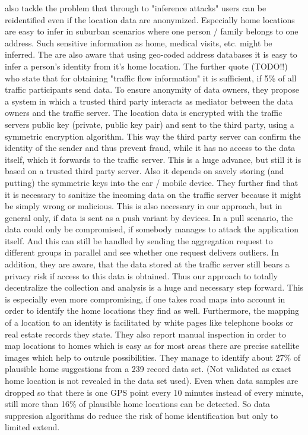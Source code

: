 \parencite{hoh2006enhancing} also tackle the problem that through to "inference attacks" users can be reidentified even if the location data are anonymized. Especially home locations are easy to infer in suburban scenarios where one person / family belongs to one address. Such sensitive information as home, medical visits, etc. might be inferred. The are also aware that using geo-coded address databases it is easy to infer a person's identity from it's home location. The further quote \parencite{dai2003simulation} (TODO!!) who state that for obtaining "traffic flow information" it is sufficient, if 5\% of all traffic participants send data. To ensure anonymity of data owners, they propose a system in which a trusted third party interacts as mediator between the data owners and the traffic server. The location data is encrypted with the traffic servers public key (private, public key pair) and sent to the third party, using a symmetric encryption algorithm. This way the third party server can confirm the identity of the sender and thus prevent fraud, while it has no access to the data itself, which it forwards to the traffic server. This is a huge advance, but still it is based on a trusted third party server. Also it depends on savely storing (and putting) the symmetric keys into the car / mobile device. They further find that it is necessary to sanitize the incoming data on the traffic server because it might be simply wrong or malicious. This is also necessary in our approach, but in general only, if data is sent as a push variant by devices. In a pull scenario, the data could only be compromised, if somebody manages to attack the application itself. And this can still be handled by sending the aggregation request to different groups in parallel and see whether one request delivers outliers. In addition, they are aware, that the data stored at the traffic server still bears a privacy risk if access to this data is obtained. Thus our approach to totally decentralize the collection and analysis is a huge and necessary step forward. This is especially even more compromising, if one takes road maps into account in order to identify the home locations they find as well. Furthermore, the mapping of a location to an identity is facilitated by white pages like telephone books or real estate records they state. They also report manual inspection in order to map locations to homes which is easy as for most areas there are precise satellite images which help to outrule possibilities. They manage to identify about 27\% of plausible home suggestions from a 239 record data set. (Not validated as exact home location is not revealed in the data set used). Even when data samples are dropped so that there is one GPS point every 10 minutes instead of every minute, still more than 16\% of plausible home locations can be detected. So data suppresion algorithms do reduce the risk of home identification but only to limited extend.


